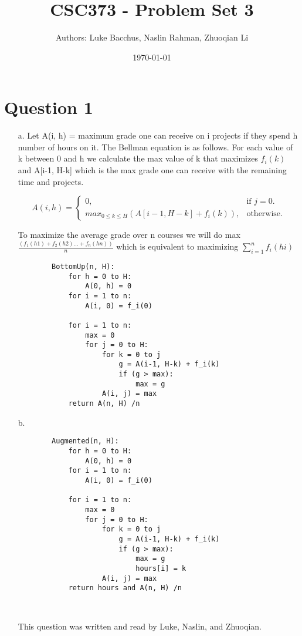 \documentclass[12pt]{article}
\title{\textbf{CSC373 - Problem Set 3}}
\author{Authors: Luke Bacchus, Naslin Rahman, Zhuoqian Li}
\date{\today}
\begin{document}
\maketitle
\section*{Question 1}
\begin{enumerate}
    \item[a.] Let A(i, h) = maximum grade one can receive on i projects if they spend h number of 
    hours on it. The Bellman equation is as follows. For each value of k between 0 and h we calculate 
    the max value of k that maximizes $f_i(k)$ and A[i-1, H-k] which is the max grade one can receive 
    with the remaining time and projects.
    
        \begin{equation}
            A(i,h)=\begin{cases}
         0, & \text{if $j=0$}.\\
        max_{0 \leq k \leq H}(A[i-1,H-k] + f_i(k)), & \text{otherwise}.
        \end{cases}
        \end{equation}
  
    To maximize the average grade over n courses we will do max $\frac{(f_1(h1) + f_2(h2) ... + f_n(hn))}{n}$ which is equivalent to maximizing $\sum_{i = 1}^ {n} f_i(hi)$
  
    \begin{verbatim}
        BottomUp(n, H):
            for h = 0 to H:
                A(0, h) = 0
            for i = 1 to n:
                A(i, 0) = f_i(0)
            
            for i = 1 to n:
                max = 0
                for j = 0 to H:
                    for k = 0 to j
                        g = A(i-1, H-k) + f_i(k)
                        if (g > max):
                            max = g
                    A(i, j) = max
            return A(n, H) /n
    \end{verbatim}
    
    \item[b.] \begin{verbatim}
        Augmented(n, H):
            for h = 0 to H:
                A(0, h) = 0
            for i = 1 to n:
                A(i, 0) = f_i(0)
            
            for i = 1 to n:
                max = 0
                for j = 0 to H:
                    for k = 0 to j
                        g = A(i-1, H-k) + f_i(k)
                        if (g > max):
                            max = g
                            hours[i] = k
                    A(i, j) = max
            return hours and A(n, H) /n
                    
        
    \end{verbatim}
    This question was written and read by  Luke, Naslin, and Zhuoqian.
\end{enumerate}
    
\end{document}
